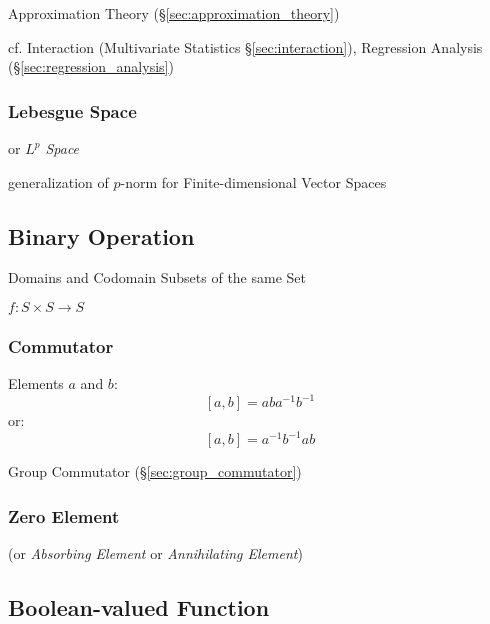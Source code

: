 Approximation Theory (\S\ref{sec:approximation_theory})

cf. Interaction (Multivariate Statistics \S\ref{sec:interaction}), Regression
Analysis (\S\ref{sec:regression_analysis})



\subsubsection{Lebesgue Space}\label{sec:lebesgue_space}

or \emph{$L^p$ Space}

generalization of $p$-norm for Finite-dimensional Vector Spaces



\subsection{Binary Operation}\label{sec:binary_operation}

Domains and Codomain Subsets of the same Set

$f : S \times S \to S$



\subsubsection{Commutator}\label{sec:commutator}

Elements $a$ and $b$:
\[
  [a,b] = aba^{-1}b^{-1}
\]
or:
\[
  [a,b] = a^{-1}b^{-1}ab
\]

Group Commutator (\S\ref{sec:group_commutator})



\subsubsection{Zero Element}\label{sec:zero_element}

(or \emph{Absorbing Element} or \emph{Annihilating Element})



\subsection{Boolean-valued Function}\label{sec:boolean_function}

